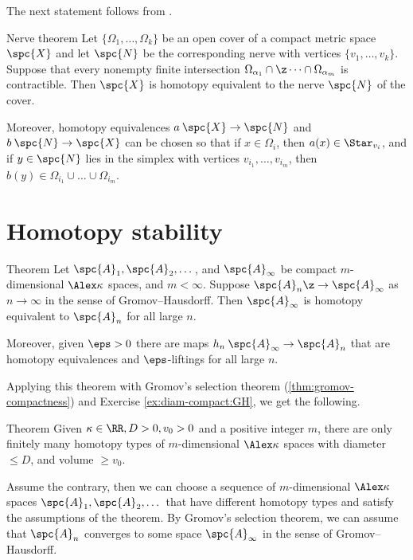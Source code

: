 The next statement follows from \cite[4G.3]{hatcher}.


\begin{thm}{Nerve theorem}\label{thm:nerve}
Let $\{\Omega_1,\dots,\Omega_k\}$ be an open cover of a compact metric space $\spc{X}$
and let $\spc{N}$ be the corresponding nerve with vertices $\{v_1,\dots,v_k\}$.
Suppose that every nonempty finite intersection $\Omega_{\alpha_1}\cap\z\dots\cap\Omega_{\alpha_m}$ is contractible.
Then $\spc{X}$ is homotopy equivalent to the nerve $\spc{N}$ of the cover.

Moreover, homotopy equivalences  $a\:\spc{X}\to \spc{N}$ and $b\:\spc{N}\to\spc{X}$ can be chosen so that
if $x\in \Omega_i$, then $a(x)\in \Star_{v_i}$,
and if $y\in\spc{N}$ lies in the simplex with vertices $v_{i_1},\dots, v_{i_m}$, then $b(y)\in \Omega_{i_1}\cup\dots\cup \Omega_{i_m}$.
\end{thm}

\section{Homotopy stability}

\begin{thm}{Theorem}\label{thm:h-stability}
Let $\spc{A}_1,\spc{A}_2,\dots$, and $\spc{A}_\infty$ be compact $m$-dimensional $\Alex\kappa$ spaces, and $m<\infty$.
Suppose $\spc{A}_n\z\to \spc{A}_\infty$ as $n\to \infty$ in the sense of Gromov--Hausdorff.
Then $\spc{A}_\infty$ is homotopy equivalent to $\spc{A}_n$ for all large $n$.

Moreover, given $\eps>0$ there are maps $h_n\:\spc{A}_\infty\to \spc{A}_n$ that are homotopy equivalences and $\eps$-liftings for all large $n$.
\end{thm}

Applying this theorem with Gromov's selection theorem (\ref{thm:gromov-compactness}) and Exercise \ref{ex:diam-compact:GH}, we get the following.


\begin{thm}{Theorem}\label{thm:h-finiteness}
Given $\kappa\in \RR, D>0, v_0>0$ and a positive integer $m$,
there are only finitely many homotopy types of $m$-dimensional $\Alex\kappa$ spaces with diameter $\le D$, and volume $\ge v_0$.
\end{thm}

Assume the contrary, then we can choose a sequence of $m$-dimensional $\Alex\kappa$ spaces $\spc{A}_1,\spc{A}_2,\dots$   that have different homotopy types and satisfy the assumptions of the theorem.
By Gromov's selection theorem, we can assume that $\spc{A}_n$ converges to some space $\spc{A}_\infty$ in the sense of Gromov--Hausdorff.

